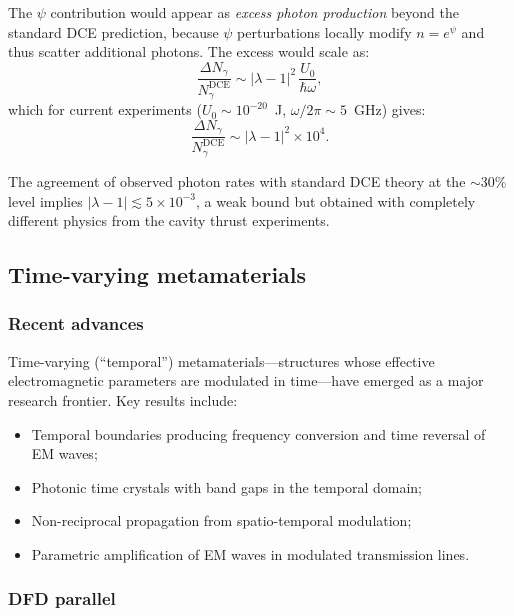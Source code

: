 \documentclass[12pt,aps,prd,twocolumn,superscriptaddress,nofootinbib]{revtex4-2}
\begin{document}
The $\psi$ contribution would appear as \emph{excess photon production}
beyond the standard DCE prediction, because $\psi$ perturbations
locally modify $n = e^\psi$ and thus scatter additional photons.  The
excess would scale as:
\begin{equation}
  \frac{\Delta N_\gamma}{N_\gamma^{\mathrm{DCE}}}
  \sim |\lambda - 1|^2\,\frac{U_0}{\hbar\omega},
  \label{eq:DCE_excess}
\end{equation}
which for current experiments ($U_0 \sim 10^{-20}$~J,
$\omega/2\pi \sim 5$~GHz) gives:
\begin{equation}
  \frac{\Delta N_\gamma}{N_\gamma^{\mathrm{DCE}}}
  \sim |\lambda - 1|^2 \times 10^{4}.
  \label{eq:DCE_estimate}
\end{equation}

The agreement of observed photon rates with standard DCE theory at the
$\sim 30\%$ level implies $|\lambda - 1| \lesssim 5\times 10^{-3}$,
a weak bound but obtained with completely different physics from the
cavity thrust experiments.

\subsection{Time-varying metamaterials}
\label{sec:time_varying}

\subsubsection{Recent advances}

Time-varying (``temporal'') metamaterials---structures whose effective
electromagnetic parameters are modulated in time---have emerged as a
major research frontier.  Key results include:
\begin{itemize}[noitemsep]
  \item Temporal boundaries producing frequency conversion and time
    reversal of EM waves;
  \item Photonic time crystals with band gaps in the temporal domain;
  \item Non-reciprocal propagation from spatio-temporal modulation;
  \item Parametric amplification of EM waves in modulated transmission
    lines.
\end{itemize}

\subsubsection{DFD parallel}
\end{document}
